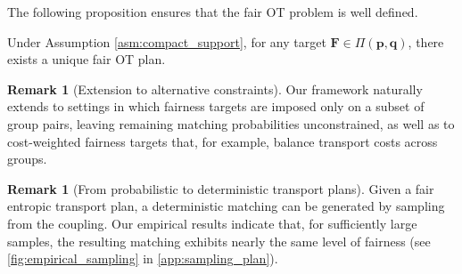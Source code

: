 \documentclass{article}
\theoremstyle{definition}
\newtheorem{remark}[theorem]{Remark}
\begin{document}
The following proposition ensures that the fair OT problem is well defined.
\begin{boxprop}
\label{prop:uniquess_existence_fair_ot}
    Under Assumption \ref{asm:compact_support}, for any  target $\mathbf{F} \in \Pi(\mathbf{p},\mathbf{q})$, there exists a unique fair OT plan.
\end{boxprop}
\vspace{.1cm}
\begin{remark}[Extension to alternative constraints]
     Our framework naturally extends to settings in which fairness targets are imposed only on a subset of group pairs, leaving remaining matching probabilities unconstrained, as well as to cost-weighted fairness targets that, for example, balance transport costs across groups.
\end{remark}
\begin{remark}[From probabilistic to deterministic transport plans]
    Given a fair entropic transport plan, a deterministic matching can be generated by sampling from the coupling. Our empirical results indicate that, for sufficiently large samples, the resulting matching exhibits nearly the same level of fairness (see \cref{fig:empirical_sampling} in \cref{app:sampling_plan}). 
\end{remark}
\end{document}
